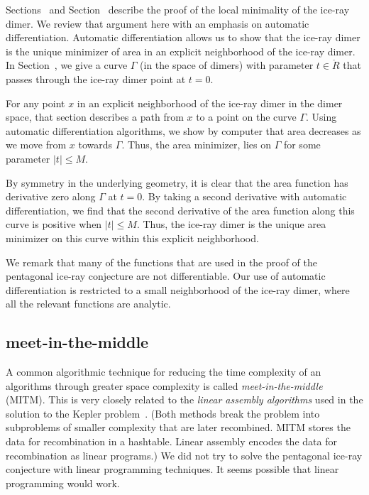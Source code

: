 Sections~ and Section~ describe
the proof of the local minimality of the ice-ray dimer.  We review
that argument here with an emphasis on automatic differentiation.
Automatic differentiation allows us to show that the ice-ray dimer is
the unique minimizer of area in an explicit neighborhood of the
ice-ray dimer.  In Section~, we give a curve
$\Gamma$ (in the space of dimers) with parameter $t\in\ring{R}$ that
passes through the ice-ray dimer point at $t=0$.

For any point $x$ in an explicit neighborhood of the ice-ray dimer in
the dimer space, that section describes a path from $x$ to a point on
the curve $\Gamma$.  Using automatic differentiation algorithms, we
show by computer that area decreases as we move from $x$ towards
$\Gamma$.  Thus, the area minimizer, lies on $\Gamma$ for some
parameter $|t|\le M$.

By symmetry in the underlying geometry, it is clear that the area
function has derivative zero along $\Gamma$ at $t=0$. By taking a
second derivative with automatic differentiation, we find that the
second derivative of the area function along this curve is positive
when $|t|\le M$.  Thus, the ice-ray dimer is the unique area minimizer
on this curve within this explicit neighborhood.

We remark that many of the functions that are used in the proof of the
pentagonal ice-ray conjecture are not differentiable.  Our use of
automatic differentiation is restricted to a small neighborhood of the
ice-ray dimer, where all the relevant functions are analytic.

\subsection{meet-in-the-middle}

A common algorithmic technique for reducing the time complexity of an
algorithms through greater space complexity is called {\it
  meet-in-the-middle} (MITM).  This is very closely related to the
{\it linear assembly algorithms} used in the solution to the Kepler
problem~\cite{hales2003some}. (Both methods break the problem into
subproblems of smaller complexity that are later recombined.  MITM
stores the data for recombination in a hashtable.  Linear assembly
encodes the data for recombination as linear programs.)  We did not
try to solve the pentagonal ice-ray conjecture with linear programming
techniques.  It seems possible that linear programming would work.

